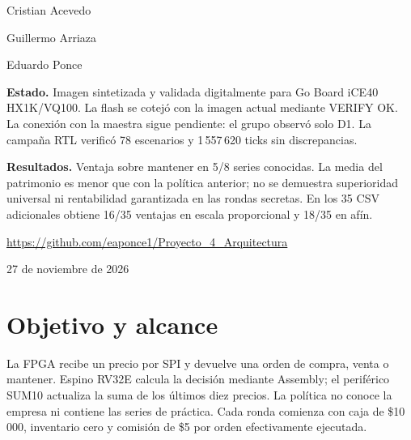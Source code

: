 \documentclass[11pt,a4paper]{article}
\begin{document}
\hypersetup{pageanchor=false}
\begin{titlepage}\centering
\vspace*{1cm}{\Large Arquitectura de Computadores\par}
\vspace{1cm}{\Huge\bfseries Proyecto 4\par}
\vspace{0.4cm}{\LARGE Pochoco Trader\par}
\vspace{1cm}{\Large Tendencia lenta: SUM10 / 128 ticks / 5\%\par}
\vspace{0.8cm}{\large Firmware RV32E, SPI y validación para FPGA\par}
{\large Cristian Acevedo\par}{\large Guillermo Arriaza\par}{\large Eduardo Ponce\par}
\vspace{1cm}\begin{minipage}{0.88\linewidth}
\textbf{Estado.} Imagen sintetizada y validada digitalmente para Go Board
iCE40 HX1K/VQ100. La flash se cotejó con la imagen actual mediante VERIFY OK. La conexión con la maestra sigue pendiente: el grupo observó solo D1.
La campaña RTL verificó 78 escenarios y 1\,557\,620 ticks sin discrepancias.

\textbf{Resultados.} Ventaja sobre mantener en 5/8 series conocidas. La media
del patrimonio es menor que con la política anterior; no se demuestra superioridad
universal ni rentabilidad garantizada en las rondas secretas. En los 35 CSV
adicionales obtiene 16/35 ventajas en escala proporcional y 18/35 en afín.
\end{minipage}\vfill
\url{https://github.com/eaponce1/Proyecto_4_Arquitectura}\par
27 de noviembre de 2026
\end{titlepage}
\hypersetup{pageanchor=true}\tableofcontents\clearpage

\section{Objetivo y alcance}
La FPGA recibe un precio por SPI y devuelve una orden de compra, venta o mantener.
Espino RV32E calcula la decisión mediante Assembly; el periférico SUM10 actualiza
la suma de los últimos diez precios. La política no conoce la empresa ni contiene
las series de práctica. Cada ronda comienza con caja de \$10\,000, inventario cero
y comisión de \$5 por orden efectivamente ejecutada.
\end{document}
